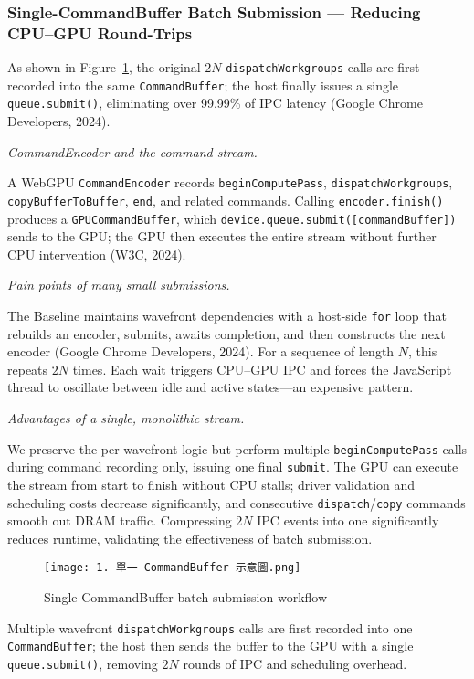 \documentclass[PhD]{PHlab-thesis}
\begin{document}
\subsubsection{Single-CommandBuffer Batch Submission — Reducing CPU–GPU Round-Trips}
As shown in Figure~\ref{fig:scb-batch-workflow}, the original $2N$ \texttt{dispatchWorkgroups} calls are first recorded into the same \texttt{CommandBuffer}; the host finally issues a single \texttt{queue.submit()}, eliminating over 99.99\% of IPC latency (Google Chrome Developers, 2024).

\textit{CommandEncoder and the command stream.}

A WebGPU \texttt{CommandEncoder} records \texttt{beginComputePass}, \texttt{dispatchWorkgroups}, \texttt{copyBufferToBuffer}, \texttt{end}, and related commands.  
Calling \texttt{encoder.finish()} produces a \texttt{GPUCommandBuffer}, which \texttt{device.queue.submit([commandBuffer])} sends to the GPU; the GPU then executes the entire stream without further CPU intervention (W3C, 2024).

\textit{Pain points of many small submissions.}

The Baseline maintains wavefront dependencies with a host-side \texttt{for} loop that rebuilds an encoder, submits, awaits completion, and then constructs the next encoder (Google Chrome Developers, 2024). For a sequence of length $N$, this repeats $2N$ times. Each wait triggers CPU–GPU IPC and forces the JavaScript thread to oscillate between idle and active states—an expensive pattern.

\textit{Advantages of a single, monolithic stream.}

We preserve the per-wavefront logic but perform multiple \texttt{beginComputePass} calls during command recording only, issuing one final \texttt{submit}. The GPU can execute the stream from start to finish without CPU stalls; driver validation and scheduling costs decrease significantly, and consecutive \texttt{dispatch}/\texttt{copy} commands smooth out DRAM traffic. Compressing $2N$ IPC events into one significantly reduces runtime, validating the effectiveness of batch submission.
\begin{figure}[htbp]
    \centering
    \texttt{[image: 1. 單一 CommandBuffer 示意圖.png]}
    \caption{Single-CommandBuffer batch-submission workflow}
    \label{fig:scb-batch-workflow}
\end{figure}

Multiple wavefront \texttt{dispatchWorkgroups} calls are first recorded into one \texttt{CommandBuffer}; the host then sends the buffer to the GPU with a single \texttt{queue.submit()}, removing $2N$ rounds of IPC and scheduling overhead.
\end{document}
